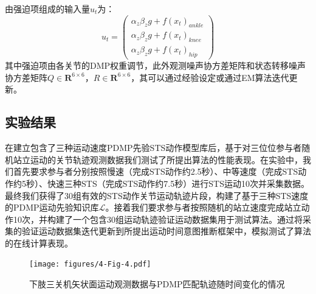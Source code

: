 由强迫项组成的输入量$u_t$为：
\begin{equation}
    u_t=\left(\begin{array}{l}
        \alpha_z \beta_z g+ f\left(x_t\right)_{ankle}\\
        \alpha_z \beta_z g+ f\left(x_t\right)_{knee}\\
        \alpha_z \beta_z g+ f\left(x_t\right)_{hip}
    \end{array}\right)
\end{equation}
其中强迫项由各关节的DMP权重调节，此外观测噪声协方差矩阵和状态转移噪声协方差矩阵$Q\in \mathbf{R}^{6 \times 6}$，$R\in \mathbf{R}^{6 \times 6}$，其可以通过经验设定或通过EM算法迭代更新\cite{bishopPatternRecognitionMachine2006}。

\subsection{实验结果} 
在建立包含了三种运动速度PDMP先验STS动作模型库后，基于对三位位参与者随机站立运动的关节轨迹观测数据我们测试了所提出算法的性能表现。在实验中，我们首先要求参与者分别按照慢速（完成STS动作约2.5秒）、中等速度（完成STS动作约5秒）、快速三种STS（完成STS动作约7.5秒）进行STS运动10次并采集数据。最终我们获得了30组有效的STS动作关节运动轨迹片段，构建了基于三种STS速度的PDMP运动先验知识库$\mathscr{L}$。接着我们要求参与者按照随机的站立速度完成站立动作10次，并构建了一个包含30组运动轨迹验证运动数据集用于测试算法。通过将采集的验证运动数据集迭代更新到所提出运动时间意图推断框架中，模拟测试了算法的在线计算表现。


\begin{figure}[!t]
    \centering
    {
        \begin{minipage}{9.5in}
            \centering
            \texttt{[image: figures/4-Fig-4.pdf]}
            \caption{下肢三关机矢状面运动观测数据与PDMP匹配轨迹随时间变化的情况}
        \label{fig:4-4}
        \end{minipage}
    }
\end{figure}

